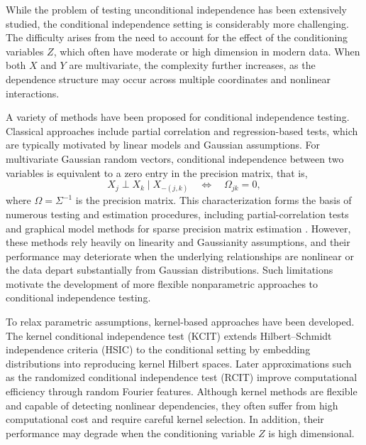 \documentclass[12pt,reqno,oneside]{amsbook}
\theoremstyle{definition}
\theoremstyle{remark}
\begin{document}
While the problem of testing unconditional independence has been extensively 
studied, the conditional independence setting is considerably more challenging. 
The difficulty arises from the need to account for the effect of the conditioning 
variables $Z$, which often have moderate or high dimension in modern data. 
When both $X$ and $Y$ are multivariate, the complexity further increases, 
as the dependence structure may occur across multiple coordinates and 
nonlinear interactions.

A variety of methods have been proposed for conditional independence testing.
Classical approaches include partial correlation and regression-based tests,
which are typically motivated by linear models and Gaussian assumptions.
For multivariate Gaussian random vectors, conditional independence between two
variables is equivalent to a zero entry in the precision matrix, that is,
\[
X_j \perp X_k \mid X_{-(j,k)}
\quad \Longleftrightarrow \quad
\Omega_{jk}=0,
\]
where $\Omega=\Sigma^{-1}$ is the precision matrix.
This characterization forms the basis of numerous testing and estimation
procedures, including partial-correlation tests and graphical model methods
for sparse precision matrix estimation
\citep{Dempster1972,Friedman2008,CaiLiu2011,Ren2015,Jankova2015}.
However, these methods rely heavily on linearity and Gaussianity assumptions,
and their performance may deteriorate when the underlying relationships are
nonlinear or the data depart substantially from Gaussian distributions.
Such limitations motivate the development of more flexible nonparametric
approaches to conditional independence testing.

To relax parametric assumptions, kernel-based approaches have been developed. 
The kernel conditional independence test (KCIT) \cite{zhang2012kernelbased} extends 
Hilbert--Schmidt independence criteria (HSIC)\cite{Gretton2005HSIC} to the conditional setting by 
embedding distributions into reproducing kernel Hilbert spaces. Later 
approximations such as the randomized conditional independence test (RCIT) 
\cite{strobl2017approximate} improve computational efficiency through random Fourier 
features. Although kernel methods are flexible and capable of detecting 
nonlinear dependencies, they often suffer from high computational cost and 
require careful kernel selection. In addition, their performance may degrade 
when the conditioning variable $Z$ is high dimensional.
\end{document}
